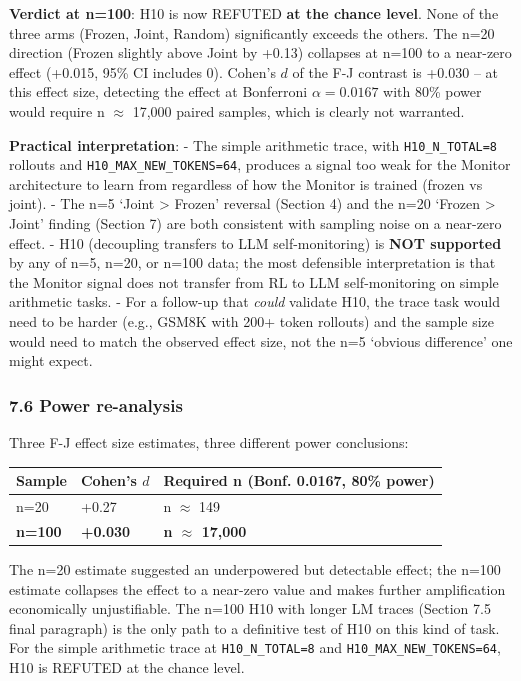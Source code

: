 \documentclass[
]{article}
\newcounter{none} %
\begin{document}
\textbf{Verdict at n=100}: H10 is now REFUTED \textbf{at the chance
level}. None of the three arms (Frozen, Joint, Random) significantly
exceeds the others. The n=20 direction (Frozen slightly above Joint by
+0.13) collapses at n=100 to a near-zero effect (+0.015, 95\% CI
includes 0). Cohen's \(d\) of the F-J contrast is +0.030 -- at this
effect size, detecting the effect at Bonferroni \(\alpha=0.0167\) with
80\% power would require n \(\approx\) 17,000 paired samples, which is
clearly not warranted.

\textbf{Practical interpretation}: - The simple arithmetic trace, with
\texttt{H10\_N\_TOTAL=8} rollouts and \texttt{H10\_MAX\_NEW\_TOKENS=64},
produces a signal too weak for the Monitor architecture to learn from
regardless of how the Monitor is trained (frozen vs joint). - The n=5
`Joint \textgreater{} Frozen' reversal (Section 4) and the n=20 `Frozen
\textgreater{} Joint' finding (Section 7) are both consistent with
sampling noise on a near-zero effect. - H10 (decoupling transfers to LLM
self-monitoring) is \textbf{NOT supported} by any of n=5, n=20, or n=100
data; the most defensible interpretation is that the Monitor signal does
not transfer from RL to LLM self-monitoring on simple arithmetic tasks.
- For a follow-up that \emph{could} validate H10, the trace task would
need to be harder (e.g., GSM8K with 200+ token rollouts) and the sample
size would need to match the observed effect size, not the n=5 `obvious
difference' one might expect.

\subsubsection{7.6 Power re-analysis}\label{power-re-analysis-1}

Three F-J effect size estimates, three different power conclusions:

{\def\LTcaptype{none} %
\begin{longtable}[]{@{}lll@{}}
\toprule\noalign{}
Sample & Cohen's \(d\) & Required n (Bonf. 0.0167, 80\% power) \\
\midrule\noalign{}
\endhead
\bottomrule\noalign{}
\endlastfoot
n=20 & +0.27 & n \(\approx\) 149 \\
\textbf{n=100} & \textbf{+0.030} & \textbf{n \(\approx\) 17,000} \\
\end{longtable}
}

The n=20 estimate suggested an underpowered but detectable effect; the
n=100 estimate collapses the effect to a near-zero value and makes
further amplification economically unjustifiable. The n=100 H10 with
longer LM traces (Section 7.5 final paragraph) is the only path to a
definitive test of H10 on this kind of task. For the simple arithmetic
trace at \texttt{H10\_N\_TOTAL=8} and \texttt{H10\_MAX\_NEW\_TOKENS=64},
H10 is REFUTED at the chance level.
\end{document}
